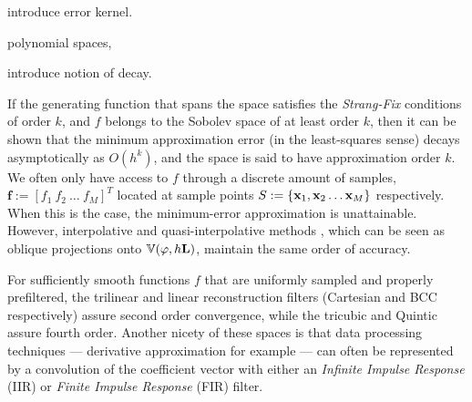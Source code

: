 introduce error kernel.

 polynomial spaces, 
 
introduce notion of decay.

If the generating function that spans the space satisfies the \emph{Strang-Fix} conditions of order $k$, and $f$ belongs to the Sobolev space of at least order $k$, then it can be shown that the minimum approximation error (in the least-squares sense) decays asymptotically as $O(h^k)$, and the space is said to have approximation order $k$. We often only have access to $f$ through a discrete amount of samples, $\mathbf{f} := \left[ f_1 \ f_2 \ \hdots \ f_M \right]^T$ located at sample points $S := \{\mathbf{x}_1, \mathbf{x}_2 \hdots \mathbf{x}_M \}$ respectively. When this is the case, the minimum-error approximation is unattainable. However, interpolative and quasi-interpolative methods \cite{quasibcc,interprev}, which can be seen as oblique projections onto $\mathbb{V}(\varphi, h\mathbf{L})$, maintain the same order of accuracy.


For sufficiently smooth functions $f$ that are uniformly sampled and properly prefiltered, the trilinear and linear reconstruction filters (Cartesian and BCC respectively) assure second order convergence, while the tricubic and Quintic assure fourth order. Another nicety of these spaces is that data processing techniques --- derivative approximation for example --- can often be represented by a convolution of the coefficient vector with either an \emph{Infinite Impulse Response} (IIR) or \emph{Finite Impulse Response} (FIR) filter. 



